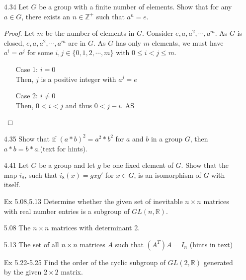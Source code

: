 \documentclass[12pt]{article}
\newcommand{\Z}{\mathds{Z}}
\newcommand{\R}{\mathbb{R}}
\begin{document}
\begin{enumerate}
\begin{proof}
				\begin{align*}
					(a*b)^{k+1} &= (a*b)*(a*b)^k\\
								&= (a*b)*(a^k*b^k)\\
								&= a*a^k*b*b^k\\
								&= a^{k+1}*b^{k+1}
				\end{align*}
				Therefore, by mathematical induction $(a * b)^n = (a^n) * (b^n)$ for all $a,b \in G$.
			\end{proof}
			\item[4.34] Let $G$ be a group with a finite number of elements. Show that for any $a \in G$, there exists an $n\in \Z^+$ such that $a^n = e$.
			\begin{proof}
				Let $ m $ be the number of elements in $ G $. Consider $ e,a,a^2,\cdots, a^m $. As $ G $ is closed,  $ e,a,a^2,\cdots, a^m $ are in $ G $. As $ G $ has only $ m $ elements, we must have $ a^i=a^j $ for some $ i,j\in\{0,1,2,\cdots,m\}  $ with $ 0\leq i < j \leq m $.
				\begin{enumerate}
					\item [Case 1:] $ i = 0 $\\
					Then, $ j $ is a positive integer with $ a^j =e $
					\item[Case 2:] $ i \not = 0 $\\
					Then, $ 0 < i < j $ and thus $ 0<j-i $. AS
				\end{enumerate}
			\end{proof}
			\item[4.35] Show that if $(a  * b)^2 = a^2  * b^2$ for $a$ and $b$ in a group $G$, then $a * b = b  * a$.(text for hints). 
			\item[4.41] Let $G$ be a group and let $g$ be one fixed element of $G$. Show that the map $i_8$, such that $i_8(x) = gxg'$ for $x\in G$, is an isomorphism of $G$ with itself.
		
		\item[Ex 5.08,5.13] Determine whether the given set of inevitable $n \times  n$ matrices with real number entries is a subgroup of $GL(n,\R)$.
			\item[5.08] The $ n \times n $ matrices with determinant 2.
			\item[5.13] The set of all $n \times n$ matrices $A$ such that $(A^T)A=I_n$ (hints in text)
		\item[Ex 5.22-5.25] Find the order of the cyclic subgroup of $GL(2,\R)$ generated by the given $2 \times 2$ matrix. 
		

\end{enumerate}
\end{document}

